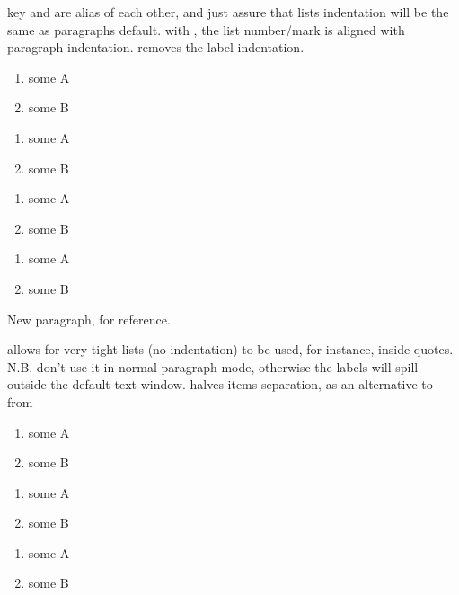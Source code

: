 \documentclass[article,nogeometry,english,tocdepth=3,secdepth=3]{ufrgscca} %
\begin{document}
\begin{describelist}{key}
	 { and  are alias of each other, and just assure that lists indentation will be the same as paragraphs default.}
	 { with , the list number/mark is aligned with paragraph indentation.}
	 {  removes the label indentation.}
\newpage
	\begin{codestore}[st=enumA]
\begin{enumerate}[tcc]
	\item some A
	\item some B
\end{enumerate}
\begin{enumerate}
	\item some A
	\item some B
\end{enumerate}
\begin{enumerate}[parindent]
	\item some A
	\item some B
\end{enumerate}
\begin{enumerate}[noindent]
	\item some A
	\item some B
\end{enumerate}

New paragraph, for reference.
\end{codestore}


	 { allows for very tight lists (no indentation) to be used, for instance, inside quotes. N.B. don't use it in normal paragraph mode, otherwise the labels will spill outside the default text window.}
	 {  halves items separation, as an alternative to  from }
	\begin{codestore}[st=enumB]
	\begin{enumerate}[tcc]
		\item some A
		\item some B
	\end{enumerate}
	\begin{enumerate}
		\item some A
		\item some B
	\end{enumerate}
	\begin{enumerate}
		\item some A
		\item some B
	\end{enumerate}
\end{codestore}


\end{describelist}
\end{document}
